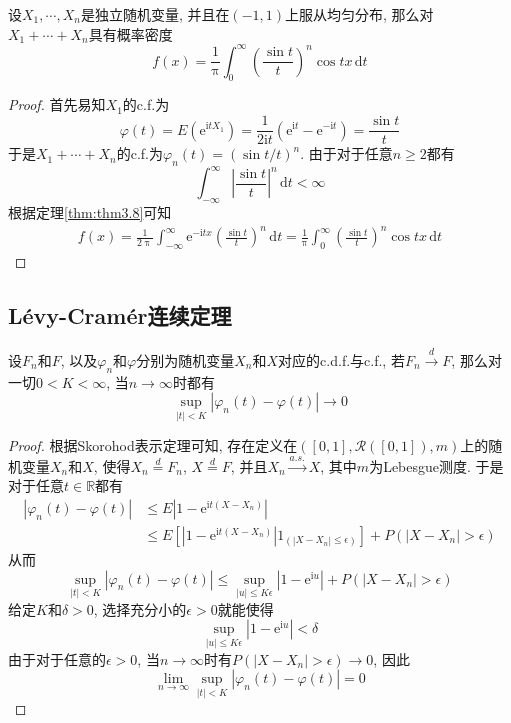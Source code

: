 \documentclass[cn, 12pt, math=mtpro2, bibstyle=apa, blue, twocol]{elegantbook}
\newcommand{\R}{\mathbb{R}}
\newcommand{\limn}{\lim_{n\to\infty}}
\begin{document}
\begin{example}
设$X_1,\cdots,X_n$是独立随机变量, 并且在$(-1,1)$上服从均匀分布, 那么对$X_1+\cdots+X_n$具有概率密度
$$f(x)=\frac{1}{\uppi}\int_{0}^{\infty}\left(\frac{\sin t}{t}\right)^n\cos tx\,\text{d}t$$
\end{example}
\begin{proof}
  首先易知$X_1$的c.f.为
  $$\varphi(t)=E(\text{e}^{\text{i}tX_1})=\frac{1}{2\text{i}t}(\text{e}^{\text{i}t}-\text{e}^{-\text{i}t})=\frac{\sin t}{t}$$
  于是$X_1+\cdots+X_n$的c.f.为$\varphi_n(t)=(\sin t/t)^n$. 由于对于任意$n\ge2$都有
  $$\int_{-\infty}^{\infty}\left|\frac{\sin t}{t}\right|^n\,\text{d}t<\infty$$
  根据定理\ref{thm:thm3.8}可知
  \begin{align*}
  f(x)=\frac{1}{2\uppi}\int_{-\infty}^{\infty}\text{e}^{-\text{i}tx}\left(\frac{\sin t}{t}\right)^n\,\text{d}t=\frac{1}{\uppi}\int_{0}^{\infty}\left(\frac{\sin t}{t}\right)^n\cos tx\,\text{d}t
  \end{align*}
\end{proof}


\subsection{Lévy-Cramér连续定理}
\begin{theorem}\label{thm:thm3.4}
  设$F_n$和$F$, 以及$\varphi_n$和$\varphi$分别为随机变量$X_n$和$X$对应的c.d.f.与c.f., 若$F_n\xrightarrow{d} F$, 那么对一切$0<K<\infty$, 当$n\to\infty$时都有
  $$\sup_{|t|<K}|\varphi_n(t)-\varphi(t)|\to0$$
\end{theorem}
\begin{proof}
  根据Skorohod表示定理可知, 存在定义在$([0,1],\mathcal{R}([0,1]),m)$上的随机变量$X_n$和$X$, 使得$X_n\overset{d}{=}F_n$, $X\overset{d}{=}F$, 并且$X_n\xrightarrow{a.s.}X$, 其中$m$为Lebesgue测度. 于是对于任意$t\in\R$都有
  \begin{align*}
  |\varphi_n(t)-\varphi(t)|&\leq E|1-\text{e}^{\text{i}t(X-X_n)}| \\
  &\leq E\left[|1-\text{e}^{\text{i}t(X-X_n)}|1_{(|X-X_n|\leq\epsilon)}\right]+P(|X-X_n|>\epsilon)
  \end{align*}
  从而
  $$\sup_{|t|<K}|\varphi_n(t)-\varphi(t)|\leq\sup_{|u|\leq K\epsilon}|1-\text{e}^{\text{i}u}|+P(|X-X_n|>\epsilon)$$
  给定$K$和$\delta>0$, 选择充分小的$\epsilon>0$就能使得
  $$\sup_{|u|\leq K\epsilon}|1-\text{e}^{\text{i}u}|<\delta$$
  由于对于任意的$\epsilon>0$, 当$n\to\infty$时有$P(|X-X_n|>\epsilon)\to0$, 因此
  $$\limn\sup_{|t|<K}|\varphi_n(t)-\varphi(t)|=0$$
\end{proof}
\end{document}
